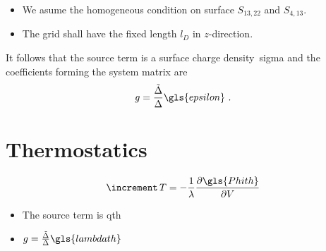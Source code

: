 \begin{itemize}
\item We asume the homogeneous  condition on surface
  $S_{13,22}$ and $S_{4,13}$.
\item The grid shall have the fixed length $l_D$ in $z$-direction.
\end{itemize}
It follows that the source term is a surface charge
density~\gls{sigma} and the coefficients forming the system matrix are
\begin{gather}
  \label{eq:22}
  g=\frac{\tilde{\Delta}}{\Delta}\gls{epsilon}\text{~.}
\end{gather}

\section{Thermostatics}
\label{sec:thermostatics}

\begin{gather}
  \label{eq:33}
  \laplaceop T = -\frac{1}{\lambda}\partdiff{\gls{Phith}}{V}
\end{gather}
\begin{itemize}
\item The source term is \gls{qth}
\item $g=\frac{\tilde{\Delta}}{\Delta}\gls{lambdath}$
\end{itemize}
  
